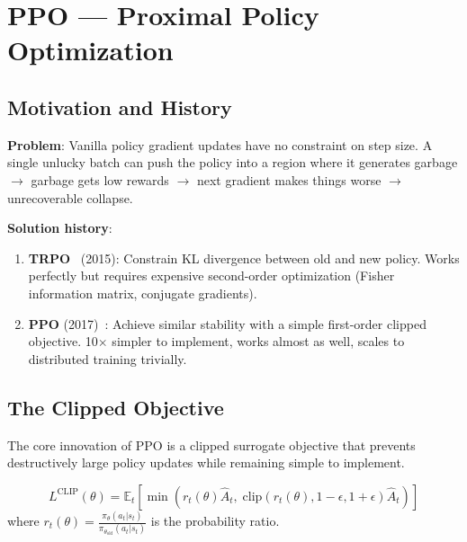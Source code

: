 \chapter{PPO --- Proximal Policy Optimization}
\label{ppo-proximal-policy-optimization}

\section{Motivation and History}
\label{motivation-and-history}

\textbf{Problem}: Vanilla policy gradient updates have no constraint on step size. A single unlucky batch can push the policy into a region where it generates garbage $\rightarrow$ garbage gets low rewards $\rightarrow$ next gradient makes things worse $\rightarrow$ unrecoverable collapse.

\textbf{Solution history}:

\begin{enumerate}
  \item \textbf{TRPO}~\cite{schulman2015trust} (2015): Constrain KL divergence between old and new policy. Works perfectly but requires expensive second-order optimization (Fisher information matrix, conjugate gradients).
  \item \textbf{PPO} (2017)~\cite{schulman2017proximal}: Achieve similar stability with a simple first-order clipped objective. 10$\times$ simpler to implement, works almost as well, scales to distributed training trivially.
\end{enumerate}

\section{The Clipped Objective}
\label{the-clipped-objective}

The core innovation of PPO is a clipped surrogate objective that prevents destructively large policy updates while remaining simple to implement.

\begin{equation}
\boxed{L^{\text{CLIP}}(\theta) = \mathbb{E}_t\left[\min\left(r_t(\theta)\hat{A}_t,\; \text{clip}(r_t(\theta), 1{-}\epsilon, 1{+}\epsilon)\hat{A}_t\right)\right]}
\end{equation}
 where $r_t(\theta) = \frac{\pi_\theta(a_t|s_t)}{\pi_{\theta_\text{old}}(a_t|s_t)}$ is the probability ratio.

